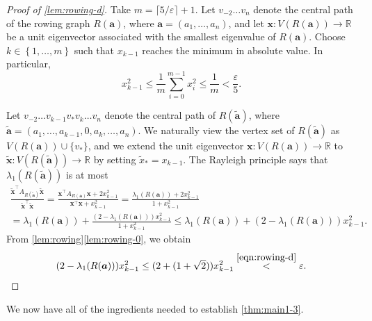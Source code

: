 \documentclass[11pt]{article}
\theoremstyle{definition}
\theoremstyle{remark}
\newcommand{\sset}[1]{\left\{{#1}\right\}}
\newcommand{\eps}{\varepsilon}
\newcommand{\la}{\lambda}
\newcommand{\R}{\mathbb{R}}
\newcommand{\ba}{\bm{a}}
\newcommand{\tba}{\tilde{\ba}}
\newcommand{\bx}{\bm{x}}
\newcommand{\tbx}{\tilde{\bx}}
\begin{document}
\begin{proof}[Proof of \ref{lem:rowing-d}]
    Take $m = \lceil 5/\eps \rceil + 1$. Let $v_{-2} \dots v_n$ denote the central path of the rowing graph $R(\ba)$, where $\ba = (a_1, \dots, a_n)$, and let $\bx\colon V(R(\ba)) \to \R$ be a unit eigenvector associated with the smallest eigenvalue of $R(\ba)$. Choose $k \in \sset{1, \dots, m}$ such that $x_{k-1}$ reaches the minimum in absolute value. In particular,
    \begin{equation} \label{eqn:rowing-d}
        x_{k-1}^2 \le \frac{1}{m} \sum_{i=0}^{m-1}x_i^2 \le \frac{1}{m} < \frac{\eps}{5}.
    \end{equation}
    
    Let $v_{-2} \dots v_{k-1}v_* v_{k} \dots v_n$ denote the central path of $R(\tba)$, where $\tba = (a_1, \dots, a_{k-1},0,a_{k}, \dots, a_n)$. We naturally view the vertex set of $R(\tba)$ as $V(R(\ba)) \cup \{ v_*\}$, and we extend the unit eigenvector $\bx\colon V(R(\ba)) \to \R$ to $\tbx\colon V(R(\tba)) \to \R$ by setting $\tilde{x}_* = x_{k-1}$. The Rayleigh principle says that $\la_1(R(\tba))$ is at most
    \begin{multline*}
        \frac{\tbx^\intercal A_{R(\tba)} \tbx}{\tbx^\intercal \tbx} = \frac{\bx^\intercal A_{R(\ba)} \bx + 2x_{k-1}^2}{\bx^\intercal \bx + x_{k-1}^2} = \frac{\la_1(R(\ba)) + 2x_{k-1}^2}{1 + x_{k-1}^2} \\
        = \la_1(R(\ba)) + \frac{(2-\la_1(R(\ba)))x_{k-1}^2}{1+x_{k-1}^2} \le \la_1(R(\ba)) + (2-\la_1(R(\ba)))x_{k-1}^2.
    \end{multline*}
    From \cref{lem:rowing}\ref{lem:rowing-0}, we obtain
    \begin{equation*}
        (2-\la_1(R(\ba)))x_{k-1}^2 \le (2 + (1 + \sqrt2))x_{k-1}^2 \stackrel{\eqref{eqn:rowing-d}}{<} \eps. \qedhere
    \end{equation*}
\end{proof}

We now have all of the ingredients needed to establish \cref{thm:main1-3}.
\end{document}
